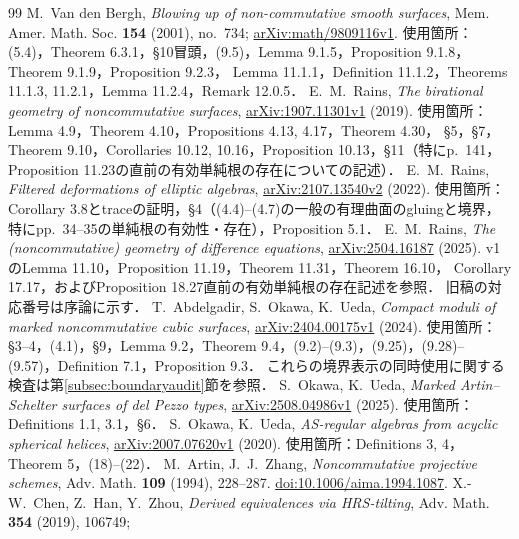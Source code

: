 \documentclass[11pt,a4paper]{ltjsarticle}
\theoremstyle{definition}
\begin{document}
\begin{thebibliography}{99}
M.~Van den Bergh, \emph{Blowing up of non-commutative smooth surfaces},
Mem. Amer. Math. Soc. \textbf{154} (2001), no.~734;
\href{https://arxiv.org/abs/math/9809116}{arXiv:math/9809116v1}.
使用箇所：(5.4)，Theorem 6.3.1，\S10冒頭，(9.5)，Lemma 9.1.5，Proposition 9.1.8，Theorem 9.1.9，Proposition 9.2.3，
Lemma 11.1.1，Definition 11.1.2，Theorems 11.1.3, 11.2.1，Lemma 11.2.4，Remark 12.0.5．
E.~M.~Rains, \emph{The birational geometry of noncommutative surfaces},
\href{https://arxiv.org/abs/1907.11301}{arXiv:1907.11301v1} (2019).
使用箇所：Lemma 4.9，Theorem 4.10，Propositions 4.13, 4.17，Theorem 4.30，
\S5，\S7，Theorem 9.10，Corollaries 10.12, 10.16，Proposition 10.13，\S11（特にp.~141，Proposition 11.23の直前の有効単純根の存在についての記述）．
E.~M.~Rains, \emph{Filtered deformations of elliptic algebras},
\href{https://arxiv.org/abs/2107.13540}{arXiv:2107.13540v2} (2022).
使用箇所：Corollary 3.8とtraceの証明，\S4（(4.4)--(4.7)の一般の有理曲面のgluingと境界，
特にpp.~34--35の単純根の有効性・存在），Proposition 5.1．
E.~M.~Rains, \emph{The (noncommutative) geometry of difference equations},
\href{https://arxiv.org/abs/2504.16187}{arXiv:2504.16187} (2025).
v1のLemma 11.10，Proposition 11.19，Theorem 11.31，Theorem 16.10，
Corollary 17.17，およびProposition 18.27直前の有効単純根の存在記述を参照．
旧稿の対応番号は序論に示す．
T.~Abdelgadir, S.~Okawa, K.~Ueda,
\emph{Compact moduli of marked noncommutative cubic surfaces},
\href{https://arxiv.org/abs/2404.00175}{arXiv:2404.00175v1} (2024).
使用箇所：\S3--4，(4.1)，\S9，Lemma 9.2，Theorem 9.4，(9.2)--(9.3)，(9.25)，(9.28)--(9.57)，Definition 7.1，Proposition 9.3．
これらの境界表示の同時使用に関する検査は第\ref{subsec:boundaryaudit}節を参照．
S.~Okawa, K.~Ueda, \emph{Marked Artin--Schelter surfaces of del Pezzo types},
\href{https://arxiv.org/abs/2508.04986}{arXiv:2508.04986v1} (2025).
使用箇所：Definitions 1.1, 3.1，\S6．
S.~Okawa, K.~Ueda, \emph{AS-regular algebras from acyclic spherical helices},
\href{https://arxiv.org/abs/2007.07620v1}{arXiv:2007.07620v1} (2020).
使用箇所：Definitions 3, 4，Theorem 5，(18)--(22)．
M.~Artin, J.~J.~Zhang, \emph{Noncommutative projective schemes},
Adv. Math. \textbf{109} (1994), 228--287.
\href{https://doi.org/10.1006/aima.1994.1087}{doi:10.1006/aima.1994.1087}.
X.-W.~Chen, Z.~Han, Y.~Zhou, \emph{Derived equivalences via HRS-tilting},
Adv. Math. \textbf{354} (2019), 106749;

\end{thebibliography}
\end{document}
